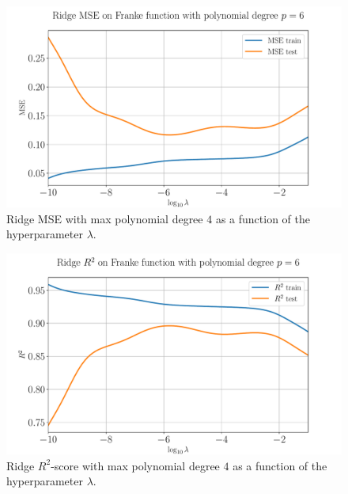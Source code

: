 \documentclass[%
reprint,
amsmath,amssymb,
aps,
pra,
]{revtex4-2}
\begin{document}
\begin{figure}[ht!]
	\centering
	\includegraphics[width=\linewidth]{Python/Figures/Ridge/RIDGE_logMSE_Unscaled.pdf}
	\caption{Ridge MSE with max polynomial degree $4$ as a function of the hyperparameter $\lambda$.}
	\label{fig:ridge_logMSE_degree}
\end{figure}
\begin{figure}[ht!]
	\centering
	\includegraphics[width=\linewidth]{Python/Figures/Ridge/RIDGE_logR2_Unscaled.pdf}
	\caption{Ridge $R^2$-score with max polynomial degree $4$ as a function of the hyperparameter $\lambda$.}
	\label{fig:ridge_logR2_degree}
\end{figure}
\end{document}
